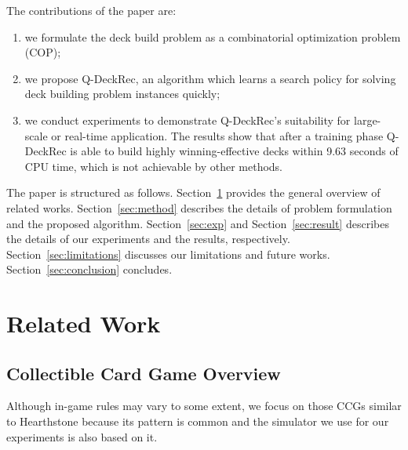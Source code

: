 The contributions of the paper are:
\begin{enumerate}
    \item we formulate the deck build problem as a combinatorial optimization problem (COP);
    \item we propose Q-DeckRec, an algorithm which learns a search policy for solving deck building problem instances quickly;
    \item we conduct experiments to demonstrate Q-DeckRec's suitability for large-scale or real-time application. The results show that after a training phase Q-DeckRec is able to build highly winning-effective decks within 9.63 seconds of CPU time, which is not achievable by other methods.
\end{enumerate}

 
The paper is structured as follows. Section~\ref{sec:previous_work} provides the general overview of related works. Section~\ref{sec:method} describes the details of problem formulation and the proposed algorithm. Section~\ref{sec:exp} and Section~\ref{sec:result} describes the details of our experiments and the results, respectively. Section~\ref{sec:limitations} discusses our limitations and future works. Section~\ref{sec:conclusion} concludes.
 





\section{Related Work}\label{sec:previous_work}

\subsection{Collectible Card Game Overview}
Although in-game rules may vary to some extent, we focus on those CCGs similar to Hearthstone because its pattern is common and the simulator we use for our experiments is also based on it. 

